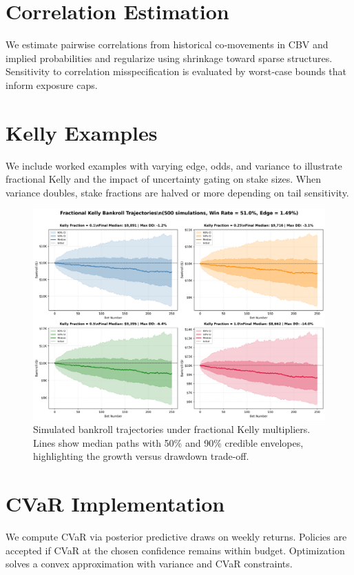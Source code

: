 \section{Correlation Estimation}
We estimate pairwise correlations from historical co‑movements in CBV and implied probabilities and regularize using shrinkage toward sparse structures. Sensitivity to correlation misspecification is evaluated by worst‑case bounds that inform exposure caps.

\section{Kelly Examples}
We include worked examples with varying edge, odds, and variance to illustrate fractional Kelly and the impact of uncertainty gating on stake sizes. When variance doubles, stake fractions are halved or more depending on tail sensitivity.

\begin{figure}[t]
  \centering
  \includegraphics[width=0.9\linewidth]{../figures/bankroll_trajectories.png}
  \caption[Fractional Kelly bankroll trajectories]{Simulated bankroll trajectories under fractional Kelly multipliers. Lines show median paths with 50\% and 90\% credible envelopes, highlighting the growth versus drawdown trade-off.}
  \label{fig:bankroll-trajectories}
\end{figure}

\section{CVaR Implementation}
We compute CVaR via posterior predictive draws on weekly returns. Policies are accepted if CVaR at the chosen confidence remains within budget. Optimization solves a convex approximation with variance and CVaR constraints.

